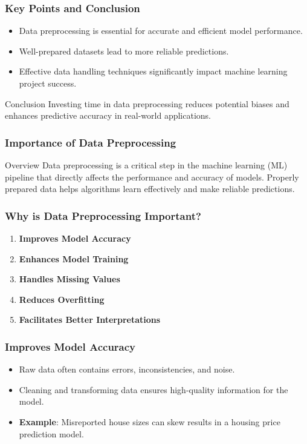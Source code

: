 \documentclass[aspectratio=169]{beamer}
\begin{document}
\begin{frame}[fragile]
    \frametitle{Key Points and Conclusion}
    \begin{itemize}
        \item Data preprocessing is essential for accurate and efficient model performance.
        \item Well-prepared datasets lead to more reliable predictions.
        \item Effective data handling techniques significantly impact machine learning project success.
    \end{itemize}

    \begin{block}{Conclusion}
        Investing time in data preprocessing reduces potential biases and enhances predictive accuracy in real-world applications.
    \end{block}
\end{frame}

\begin{frame}[fragile]
    \frametitle{Importance of Data Preprocessing}
    \begin{block}{Overview}
        Data preprocessing is a critical step in the machine learning (ML) pipeline that directly affects the performance and accuracy of models. Properly prepared data helps algorithms learn effectively and make reliable predictions.
    \end{block}
\end{frame}

\begin{frame}[fragile]
    \frametitle{Why is Data Preprocessing Important?}
    \begin{enumerate}
        \item \textbf{Improves Model Accuracy}
        \item \textbf{Enhances Model Training}
        \item \textbf{Handles Missing Values}
        \item \textbf{Reduces Overfitting}
        \item \textbf{Facilitates Better Interpretations}
    \end{enumerate}
\end{frame}

\begin{frame}[fragile]
    \frametitle{Improves Model Accuracy}
    \begin{itemize}
        \item Raw data often contains errors, inconsistencies, and noise.
        \item Cleaning and transforming data ensures high-quality information for the model.
        \item \textbf{Example}: Misreported house sizes can skew results in a housing price prediction model.
    \end{itemize}
\end{frame}
\end{document}

